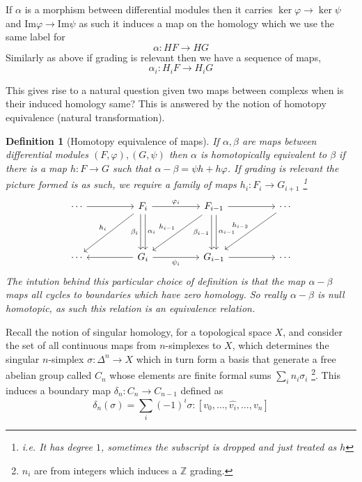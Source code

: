 \documentclass[12pt]{article}
\numberwithin{equation}{section}
\newcommand{\Z}{\mathbb{Z}}
\newcommand{\image}{{\mathrm{Im}}}
\newtheorem{definition}{Definition}[section]
\begin{document}
	If $\alpha $ is a morphism between differential modules then it carries $\ker \varphi \to \ker \psi$ and $\image \varphi \to \image \psi$ as such it induces a map on the homology which we use the same label for $$\alpha: HF \to HG$$
	Similarly as above if grading is relevant then we have a sequence of maps,
	\[ \alpha_i: H_i F \to H_i G \]
	
	This gives rise to a natural question given two maps between complexs when is their induced homology same? This is answered by the notion of homotopy equivalence (natural transformation).
	
	\begin{definition}[Homotopy equivalence of maps]
		If $\alpha, \beta $ are maps between differential modules $(F, \varphi), (G, \psi )$ then $\alpha $ is homotopically equivalent to $\beta $ if there is a map $h: F \to G $ such that $\alpha - \beta = \psi h+ h \varphi$. If grading is relevant the picture formed is as such, we require a family of maps $h_i: F_i \to G_{i+1}$ \footnote{i.e. It has degree $1$, sometimes the subscript is dropped and just treated as $h$}
		\[\begin{tikzcd}
			\cdots && {F_i} && {F_{i-1}} && \cdots \\
			\\
			\cdots && {G_i} && {G_{i-1}} && \cdots
			\arrow["{\varphi_i}", from=1-3, to=1-5]
			\arrow["{\psi_i}"', from=3-3, to=3-5]
			\arrow["{h_{i-1}}"', from=1-5, to=3-3]
			\arrow["{\beta_i}"', shift right, from=1-3, to=3-3]
			\arrow[from=3-3, to=3-1]
			\arrow["{h_i}"', from=1-3, to=3-1]
			\arrow["{\alpha_{i-1}}", shift left, from=1-5, to=3-5]
			\arrow[from=1-1, to=1-3]
			\arrow["{h_{i-2}}"', from=1-7, to=3-5]
			\arrow[from=1-5, to=1-7]
			\arrow["{\alpha_i}", shift left, from=1-3, to=3-3]
			\arrow["{\beta_{i-1}}"', shift right, from=1-5, to=3-5]
			\arrow[from=3-5, to=3-7]
		\end{tikzcd}\]
		The intution behind this particular choice of definition is that the map $\alpha - \beta $ maps all cycles to boundaries which have zero homology. So really $\alpha- \beta$ is null homotopic, as such this relation is an equivalence relation.
	\end{definition}
	Recall the notion of singular homology, for a topological space $X$, and consider the set of all continuous maps from $n$-simplexes to $X$, which determines the singular $n$-simplex $\sigma: \Delta^n \to X$ which in turn form a basis that generate a free abelian group called $C_n$ whose elements are finite formal sums $
	\sum_i n_i \sigma_i$ \footnote{$n_i$ are from integers which induces a $\Z$ grading.}. This induces a boundary map $\delta_n:C_n \to C_{n-1}$ defined as \[ \delta_n(\sigma) = \sum_i (-1)^i \sigma:[v_0, \dots, \hat{v_i}, \dots, v_n]\]
\end{document}
